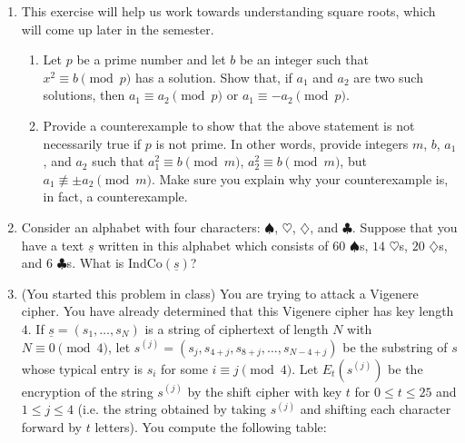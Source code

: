 \documentclass[12pt]{article}
\begin{document}
\begin{enumerate}
\item This exercise will help us work towards understanding square roots, which will come up later in the semester. 
\begin{enumerate}
\item Let $p$ be a prime number and let $b$ be an integer such that $x^2\equiv b\pmod{p}$ has a solution.  Show that,  if $a_1$ and $a_2$ are two such solutions, then $a_1\equiv a_2\pmod{p}$ or $a_1\equiv -a_2\pmod{p}$. 
\item Provide a counterexample to show that the above statement is not necessarily true if $p$ is not prime. In other words, provide integers $m$, $b$, $a_1$, and $a_2$ such that $a_1^2\equiv b\pmod{m}$, $a_2^2\equiv b\pmod{m}$, but $a_1\not \equiv \pm a_2 \pmod{m}$. Make sure you explain why your counterexample is, in fact, a counterexample. 
\end{enumerate}
\item Consider an alphabet with four characters: $\spadesuit$, $\heartsuit$, $\diamondsuit$, and $\clubsuit$.  Suppose that you have a text $\underline{s}$ written in this alphabet which consists of $60$ $\spadesuit$s,  $14$ $\heartsuit$s, $20$ $\diamondsuit$s, and $6$ $\clubsuit$s.  What is $\textrm{IndCo}(\underline{s})$?
\item  (You started this problem in class) You are trying to attack a Vigenere cipher.  You have already determined that this Vigenere cipher has key length $4$.  If $\underline{s} = (s_1, \ldots, s_{N})$ is a string of ciphertext of length $N$ with $N \equiv 0 \pmod4$, let $s^{(j)} = (s_j,s_{4+j},s_{8+j},\ldots,s_{N-4+j})$ be the substring of $s$ whose typical entry is $s_i$ for some $i \equiv j \pmod 4$.  Let $E_t(s^{(j)})$ be the encryption of the string $s^{(j)}$ by the shift cipher with key $t$ for $0 \leq t \leq 25$ and $1 \leq j \leq 4$ (i.e. the string obtained by taking $s^{(j)}$ and shifting each character forward by $t$ letters).  You compute the following table:


\end{enumerate}
\end{document}

